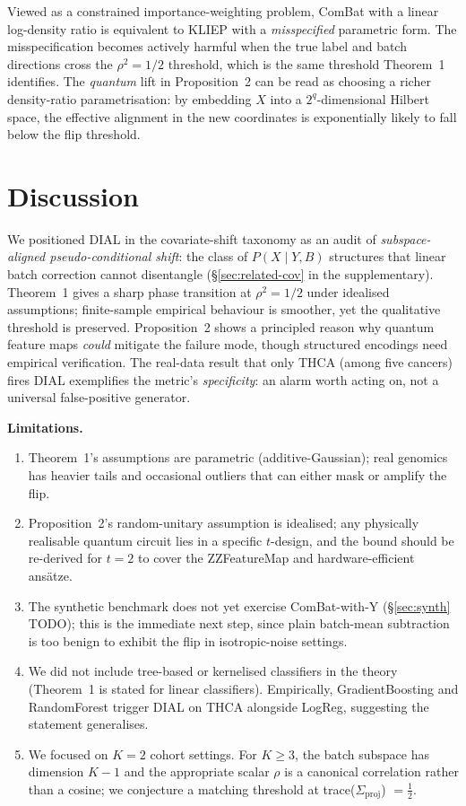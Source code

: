 \documentclass[letterpaper,11pt]{article}
\begin{document}
Viewed as a constrained importance-weighting problem, ComBat with a
linear log-density ratio is equivalent to KLIEP
\cite{sugiyama2012kliep} with a \emph{misspecified} parametric form. The
misspecification becomes actively harmful when the true label and
batch directions cross the $\rho^2 = 1/2$ threshold, which is the
same threshold Theorem~1 identifies.
The \emph{quantum} lift in Proposition~2 can be read as choosing a
richer density-ratio parametrisation: by embedding $X$ into a
$2^q$-dimensional Hilbert space, the effective alignment in the new
coordinates is exponentially likely to fall below the flip threshold.

\section{Discussion}
\label{sec:disc}

We positioned DIAL in the covariate-shift taxonomy as an audit of
\emph{subspace-aligned pseudo-conditional shift}: the class of
$P(X\mid Y,B)$ structures that linear batch correction cannot
disentangle (\S\ref{sec:related-cov} in the
supplementary). Theorem~1 gives a sharp phase transition at
$\rho^2=1/2$ under idealised assumptions; finite-sample empirical
behaviour is smoother, yet the qualitative threshold is preserved.
Proposition~2 shows a principled reason why quantum feature maps
\emph{could} mitigate the failure mode, though structured encodings
need empirical verification. The real-data result that only THCA
(among five cancers) fires DIAL exemplifies the metric's
\emph{specificity}: an alarm worth acting on, not a universal
false-positive generator.

\textbf{Limitations.}
\begin{enumerate}
\item Theorem~1's assumptions are parametric (additive-Gaussian);
  real genomics has heavier tails and occasional outliers that can
  either mask or amplify the flip.
\item Proposition~2's random-unitary assumption is idealised; any
  physically realisable quantum circuit lies in a specific
  $t$-design, and the bound should be re-derived for $t=2$ to cover
  the ZZFeatureMap and hardware-efficient ansätze.
\item The synthetic benchmark does not yet exercise ComBat-with-Y
  (\S\ref{sec:synth} TODO); this is the immediate next step, since
  plain batch-mean subtraction is too benign to exhibit the flip in
  isotropic-noise settings.
\item We did not include tree-based or kernelised classifiers in the
  theory (Theorem~1 is stated for linear classifiers). Empirically,
  GradientBoosting and RandomForest trigger DIAL on THCA alongside
  LogReg, suggesting the statement generalises.
\item We focused on $K=2$ cohort settings. For $K\ge 3$, the batch
  subspace has dimension $K-1$ and the appropriate scalar $\rho$ is
  a canonical correlation rather than a cosine; we conjecture a
  matching threshold at trace($\Sigma_{\mathrm{proj}}$) $=\tfrac12$.
\end{enumerate}
\end{document}
